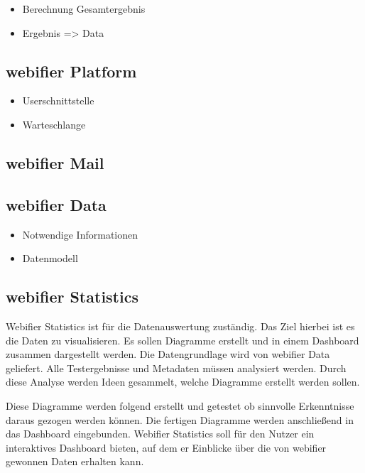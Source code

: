 
\begin{itemize}
  \item Berechnung Gesamtergebnis
  \item Ergebnis => Data
\end{itemize}

\subsection{webifier Platform}


\begin{itemize}
  \item Userschnittstelle
  \item Warteschlange
\end{itemize}

\subsection{webifier Mail}


\subsection{webifier Data}


\begin{itemize}
  \item Notwendige Informationen
  \item Datenmodell
\end{itemize}

\subsection{webifier Statistics}

Webifier Statistics ist für die Datenauswertung zuständig. Das Ziel hierbei ist es die Daten zu visualisieren. Es sollen Diagramme erstellt und in einem Dashboard zusammen dargestellt werden. Die Datengrundlage wird von webifier Data geliefert. Alle Testergebnisse und Metadaten müssen analysiert werden. Durch diese Analyse werden Ideen gesammelt, welche Diagramme erstellt werden sollen.

Diese Diagramme werden folgend erstellt und getestet ob sinnvolle Erkenntnisse daraus gezogen werden können. Die fertigen Diagramme werden anschließend in das Dashboard eingebunden. Webifier Statistics soll für den Nutzer ein interaktives Dashboard bieten, auf dem er Einblicke über die von webifier gewonnen Daten erhalten kann.


